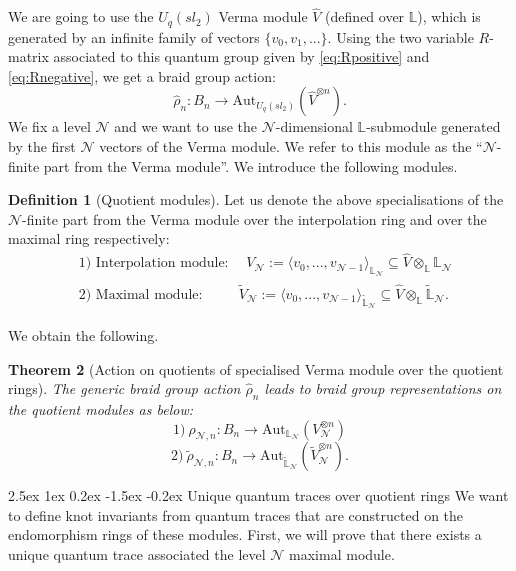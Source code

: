 \documentclass[reqno,a4paper,11pt]{amsart}
\makeatletter
\numberwithin{equation}{section}
\numberwithin{figure}{section}
\theoremstyle{definition}
\newtheorem{defn}{Definition}[section]
\theoremstyle{plain}
\newtheorem{thm}[defn]{Theorem}
\renewcommand*{\subsection}{\@startsection{subsection}{2}{\z@}%
	{2.5ex \@plus 1ex \@minus 0.2ex}%
	{-1.5ex \@plus -0.2ex}%
	{\normalfont\normalsize\bfseries}}
\newcommand{\Li}{{\mathbb L}}
\newcommand{\Aut}{\mathrm{Aut}}
\newcommand{\cN}{\mathcal{N}}
\makeatother
\begin{document}
We are going to use the $U_q(sl_2)$ Verma module $\hat{V}$ (defined over $\Li$), which is generated by an infinite family of vectors $\{v_0, v_1,...\}$. 
Using the two variable $R$-matrix associated to this quantum group given by \eqref{eq:Rpositive} and \eqref{eq:Rnegative},
 we get a braid group action:
\begin{equation}
\hat{\rho}_n: B_n \rightarrow \Aut_{U_q(sl_2)}\left(\hat{V}^{\otimes n}\right). 
\end{equation}
%
We fix a level $\cN$ and we want to use the $\cN$-dimensional $\Li$-submodule generated by the first $\cN$ vectors of the Verma module. 
We refer to this module as the ``$\cN$-finite part from the Verma module''. 
We introduce the following modules. 
%
\begin{defn}[Quotient modules]
Let us denote the above specialisations of the $\cN$-finite part from the Verma module over the interpolation ring and over the maximal ring respectively: 
\begin{equation}
\begin{aligned}
& 1) \text{ Interpolation module}: \ \ \ \ \
V_{\cN}:=\langle v_{0},...,v_{\cN-1}\rangle_{\Li_{\cN}} \subseteq \hat{V}\otimes_{\Li}{\Li_{\cN}}\\
& 2)  \text{ Maximal module}: \ \ \ \ \ \ \ \ \ \ \ \widetilde{V}_{\cN}:=\langle v_{0},...,v_{\cN-1}\rangle_{\widetilde{\Li}_{\cN}} \subseteq \hat{V}\otimes_{\Li}{\widetilde{\Li}_{\cN}}.
\end{aligned}
\end{equation}
\end{defn}
We obtain the following. 
\begin{thm}[Action on quotients of specialised Verma module over the quotient rings] 
The generic braid group action $\hat{\rho}_n$ leads to braid group representations on the quotient modules as below:
$$1) \ \rho_{\cN,n}  :B_n \rightarrow \Aut_{\Li_{\cN}} \left( V_{\cN}^{\otimes n}\right) $$
$$2) \ \widetilde{\rho}_{\cN,n}  :B_n \rightarrow \Aut_{\widetilde{\Li}_{\cN}} \left( \widetilde{V}_{\cN}^{\otimes n}\right). $$
\end{thm}


\subsection{Unique quantum traces over quotient rings}
We want to define knot invariants from quantum traces that are constructed on the endomorphism rings of these modules. 
First, we will prove that there exists a unique quantum trace associated the level $\cN$ maximal module.
 
\end{document}
